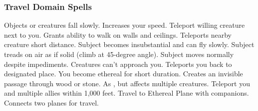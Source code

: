 \begin{comment}
\subsubsection{Sun Domain Spells}

\begin{spelllist}
  \spellhead[1]{Daylight} Large radius of bright light.
  \spellhead[2]{Flaming Sphere} Creates rolling ball of fire, 2d6 damage, lasts short duration.
  \spellhead[2]{Blindness/Deafness \fn{1}}
  \spellhead[3]{Plant Growth}
  \spellhead[3]{Searing Light} Ray deals 1d8/ two levels, more against undead.
  \spellhead[4]{Death Ward} Grants immunity to death spells and negative energy effects.
  \spellhead[4]{Disrupting Weapon} Melee weapon destroys undead.
  \spellhead[5]{Wall of Fire} Passing through wall deals 5d6 damage
  \spellhead[5]{Flame Strike} Smite foes with divine fire for 5d6 damage.
  \spellhead[6]{Fire Seeds} Acorns and berries become grenades and bombs.
  \spellhead[6]{Sunbeam} Multiple beams blind and deal 5d6 damage in large line.
  \spellhead[7]{Prismatic Spray} Rays hit subjects with variety of effects.
  \spellhead[7]{Sunburst} Blinds all within large radius, deals 10d6 damage.
  \spellhead[8]{Fire Storm} Deals 8d6 fire damage to enemies in large spread.
  \spellhead[8]{Prismatic Wall} Wall's colors have array of effects.
  \spellhead[9]{Meteor Swarm} Massive hail of meteors deals 9d8 damage.
  \spellhead[9]{Prismatic Sphere} As prismatic wall, but surrounds on all sides.
\end{spelllist}
1. Blindness only
\end{comment}

\subsubsection{Travel Domain Spells}

\begin{spelllist}
   Objects or creatures fall slowly.
   Increases your speed.
   Teleport willing creature next to you.
   Grants ability to walk on walls and ceilings.
   Teleports nearby creature short distance.
   Subject becomes insubstantial and can fly slowly.
   Subject treads on air as if solid (climb at 45-degree angle).
   Subject moves normally despite impediments.
  \spellhead[5]{}
  \spellhead[5]{}
   Creatures can't approach you.
   Teleports you back to designated place.
   You become ethereal for short duration.
   Creates an invisible passage through wood or stone.
   As , but affects multiple creatures.
   Teleport you and multiple allies within 1,000 feet.
   Travel to Ethereal Plane with companions.
   Connects two planes for travel.
\end{spelllist}

